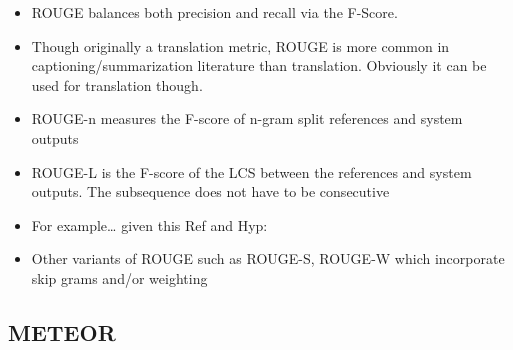 \documentclass[11pt]{article}
\begin{document}
\begin{minipage}[r]{.5\linewidth}
    \begin{itemize}
        \item ROUGE balances both precision and recall via the F-Score.
        \item Though originally a translation metric, ROUGE is more common in captioning/summarization literature than translation. Obviously it can be used for translation though.
        \item ROUGE-n measures the F-score of n-gram split references and system outputs  
        \item ROUGE-L is the F-score of the LCS between the references and system outputs. The subsequence does not have to be consecutive
        \item For example… given this Ref and Hyp: 
        \item Other variants of ROUGE such as ROUGE-S, ROUGE-W which incorporate skip grams and/or weighting
    \end{itemize}
\end{minipage}

\subsection{METEOR}
\end{document}

